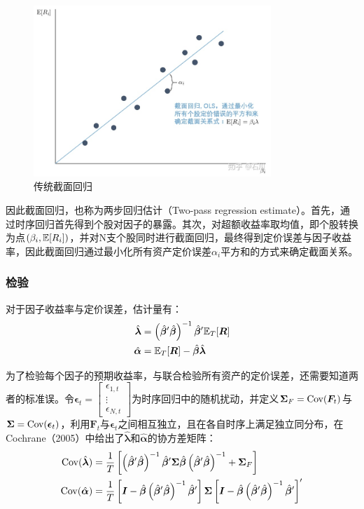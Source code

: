 \documentclass[11pt]{article}
\begin{document}
\begin{figure}[H]
    \centering
    \includegraphics[width=0.8\textwidth]{fig/cs-reg.jpg}
    \caption{传统截面回归}
    \label{fig:cs-reg}
\end{figure}

因此截面回归，也称为两步回归估计（Two-pass regression estimate）。首先，通过时序回归首先得到个股对因子的暴露。其次，对超额收益率取均值，即个股转换为点$(\beta_i,\mathbb{E}[R_i])$，并对N支个股同时进行截面回归，最终得到定价误差与因子收益率，因此截面回归通过最小化所有资产定价误差$\alpha_i$平方和的方式来确定截面关系。

\subsubsection{检验}

对于因子收益率与定价误差，估计量有：
\begin{align*}
    \hat{\bm{\lambda}} &= \left( \hat{\bm{\beta}}' \hat{\bm{\beta}}\right)^{-1} \hat{\bm{\beta}}' \mathbb{E}_T[\bm{R}] \\
    \hat{\bm{\alpha}} &= \mathbb{E}_T[\bm{R}] - \hat{\bm{\beta}} \hat{\bm{\lambda}}
\end{align*}

为了检验每个因子的预期收益率，与联合检验所有资产的定价误差，还需要知道两者的标准误。令$\bm{\epsilon}_t = \begin{bmatrix} \epsilon_{1,t} \\ \vdots \\ \epsilon_{N,t} \end{bmatrix}$为时序回归中的随机扰动，并定义$\bm{\Sigma}_F = \operatorname{Cov}(\bm{F}_t)$与$\bm{\Sigma} = \operatorname{Cov}(\bm{\epsilon}_t)$，利用$\bm{F}_t$与$\bm{\epsilon}_t$之间相互独立，且在各自时序上满足独立同分布，在Cochrane（2005）中给出了$\hat{\bm{\lambda}}$和$\hat{\bm{\alpha}}$的协方差矩阵：
\begin{align*}
    \operatorname{Cov}(\hat{\bm{\lambda}}) &= \frac{1}{T} \left[ \left(\hat{\bm{\beta}}'\hat{\bm{\beta}}\right)^{-1} \hat{\bm{\beta}}' \bm{\Sigma} \hat{\bm{\beta}} \left(\hat{\bm{\beta}}'\hat{\bm{\beta}}\right)^{-1} + \bm{\Sigma}_{F} \right] \\
    \operatorname{Cov}(\hat{\bm{\alpha}}) &= \frac{1}{T} \left[ \bm{I} - \hat{\bm{\beta}} \left(\hat{\bm{\beta}}'\hat{\bm{\beta}}\right)^{-1} \hat{\bm{\beta}}' \right] \bm{\Sigma} \left[ \bm{I} - \hat{\bm{\beta}} \left(\hat{\bm{\beta}}'\hat{\bm{\beta}}\right)^{-1} \hat{\bm{\beta}}' \right]'
\end{align*}
\end{document}
